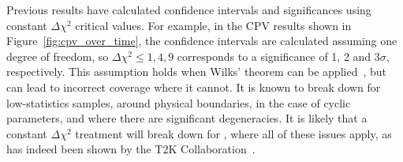 Previous results have calculated confidence intervals and significances using constant $\Delta\chi^{2}$ critical values. For example, in the CPV results shown in Figure~\ref{fig:cpv_over_time}, the confidence intervals are calculated assuming one degree of freedom, so $\Delta\chi^{2} \leq 1, 4, 9$ corresponds to a significance of 1, 2 and 3$\sigma$, respectively. This assumption holds when Wilks' theorem can be applied~\cite{wilks}, but can lead to incorrect coverage where it cannot. It is known to break down for low-statistics samples, around physical boundaries, in the case of cyclic parameters, and where there are significant degeneracies. It is likely that a constant $\Delta\chi^{2}$ treatment will break down for \deltacp, where all of these issues apply, as has indeed been shown by the T2K Collaboration~\cite{Abe:2021gky}.

